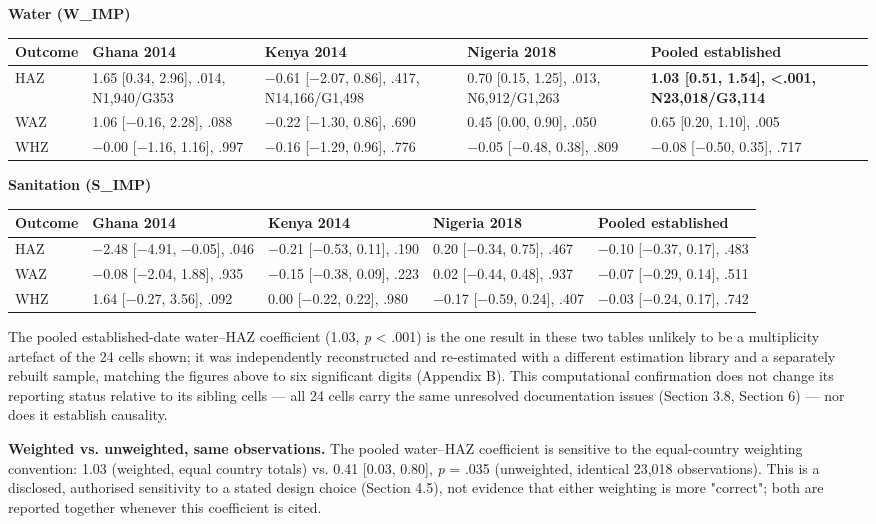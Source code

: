 \textbf{Water (W\_IMP)}

\begingroup\fontsize{10}{15}\selectfont
\begin{longtable}{lllll}
\toprule
Outcome & Ghana 2014 & Kenya 2014 & Nigeria 2018 & Pooled established \\
\midrule
\endhead
HAZ & 1.65 [0.34, 2.96], .014, N1,940/G353 & −0.61 [−2.07, 0.86], .417, N14,166/G1,498 & 0.70 [0.15, 1.25], .013, N6,912/G1,263 & \textbf{1.03 [0.51, 1.54], <.001, N23,018/G3,114} \\
WAZ & 1.06 [−0.16, 2.28], .088 & −0.22 [−1.30, 0.86], .690 & 0.45 [0.00, 0.90], .050 & 0.65 [0.20, 1.10], .005 \\
WHZ & −0.00 [−1.16, 1.16], .997 & −0.16 [−1.29, 0.96], .776 & −0.05 [−0.48, 0.38], .809 & −0.08 [−0.50, 0.35], .717 \\
\bottomrule
\end{longtable}
\endgroup

\textbf{Sanitation (S\_IMP)}

\begingroup\fontsize{10}{15}\selectfont
\begin{longtable}{lllll}
\toprule
Outcome & Ghana 2014 & Kenya 2014 & Nigeria 2018 & Pooled established \\
\midrule
\endhead
HAZ & −2.48 [−4.91, −0.05], .046 & −0.21 [−0.53, 0.11], .190 & 0.20 [−0.34, 0.75], .467 & −0.10 [−0.37, 0.17], .483 \\
WAZ & −0.08 [−2.04, 1.88], .935 & −0.15 [−0.38, 0.09], .223 & 0.02 [−0.44, 0.48], .937 & −0.07 [−0.29, 0.14], .511 \\
WHZ & 1.64 [−0.27, 3.56], .092 & 0.00 [−0.22, 0.22], .980 & −0.17 [−0.59, 0.24], .407 & −0.03 [−0.24, 0.17], .742 \\
\bottomrule
\end{longtable}
\endgroup

The pooled established-date water--HAZ coefficient (1.03, \textit{p} < .001) is the one result in these two tables unlikely to be a multiplicity artefact of the 24 cells shown; it was independently reconstructed and re-estimated with a different estimation library and a separately rebuilt sample, matching the figures above to six significant digits (Appendix B). This computational confirmation does not change its reporting status relative to its sibling cells --- all 24 cells carry the same unresolved documentation issues (Section 3.8, Section 6) --- nor does it establish causality.

\textbf{Weighted vs. unweighted, same observations.} The pooled water--HAZ coefficient is sensitive to the equal-country weighting convention: 1.03 (weighted, equal country totals) vs. 0.41 [0.03, 0.80], \textit{p} = .035 (unweighted, identical 23,018 observations). This is a disclosed, authorised sensitivity to a stated design choice (Section 4.5), not evidence that either weighting is more "correct"; both are reported together whenever this coefficient is cited.

